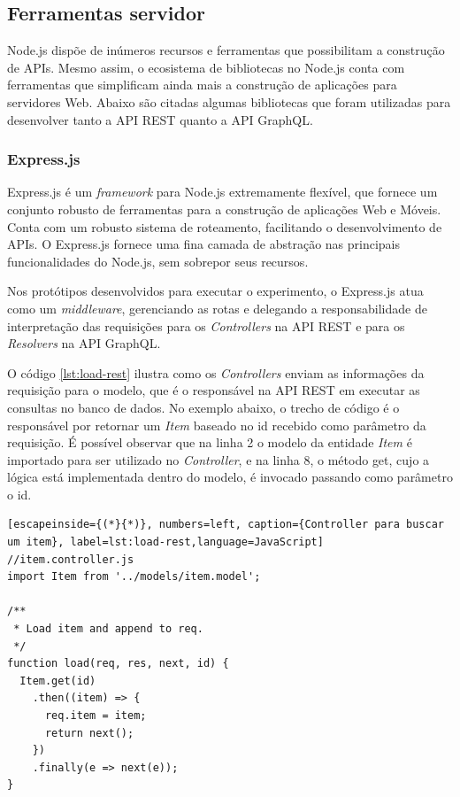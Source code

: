 \subsection{Ferramentas servidor}

Node.js dispõe de inúmeros recursos e ferramentas que possibilitam a construção de APIs. Mesmo assim, o ecosistema de bibliotecas no Node.js conta com ferramentas que simplificam ainda mais a construção de aplicações para servidores Web. Abaixo são citadas algumas bibliotecas que foram utilizadas para desenvolver tanto a API REST quanto a API GraphQL. 

\subsubsection*{Express.js}

Express.js é um \textit{framework} para Node.js extremamente flexível, que fornece um conjunto robusto de ferramentas para a construção de aplicações Web e Móveis. Conta com um robusto sistema de roteamento, facilitando o desenvolvimento de APIs. O Express.js fornece uma fina camada de abstração nas principais funcionalidades do Node.js, sem sobrepor seus recursos.

Nos protótipos desenvolvidos para executar o experimento, o Express.js atua como um \textit{middleware}, gerenciando as rotas e delegando a responsabilidade de interpretação das requisições para os \textit{Controllers} na API REST e para os \textit{Resolvers} na API GraphQL.

O código \ref{lst:load-rest} ilustra como os \textit{Controllers} enviam as informações da requisição para o modelo, que é o responsável na API REST em executar as consultas no banco de dados. No exemplo abaixo, o trecho de código é o responsável por retornar um \textit{Item} baseado no \textup{id} recebido como parâmetro da requisição. É possível observar que na linha 2 o modelo da entidade \textit{Item} é importado para ser utilizado no \textit{Controller}, e na linha 8, o método \textup{get}, cujo a lógica está implementada dentro do modelo, é invocado passando como parâmetro o \textup{id}.

\begin{lstlisting}[escapeinside={(*}{*)}, numbers=left, caption={Controller para buscar um item}, label=lst:load-rest,language=JavaScript]
//item.controller.js
import Item from '../models/item.model';

/**
 * Load item and append to req.
 */
function load(req, res, next, id) {
  Item.get(id)
    .then((item) => {
      req.item = item;
      return next();
    })
    .finally(e => next(e));
}

\end{lstlisting}

